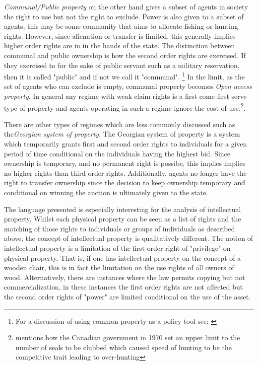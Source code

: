 \documentclass[12pt]{article}
\numberwithin{equation}{section}
\begin{document}
\textit{Communal/Public property} on the other hand gives a subset of agents in society the right to use but not the right to exclude. Power is also given to a subset of agents, this may be some community that aims to allocate fishing or hunting rights. 
However, since alienation or transfer is limited, this generally implies higher order rights are in in the hands of the state. The distinction between communal and public ownership is how the second order rights are exercised. If they exercised to for the sake of public servant such as a military reservation, then it is called "public" and if not we call it "communal". \footnote{For a discussion of using common property as a policy tool see: \cite{ciriacy1975common}} In the limit, as the set of agents who can exclude is empty, communal property becomes \textit{Open access property}. In general any regime with weak claim rights is a first come first serve type of property and agents operating in such a regime ignore the cost of use.\footnote{\cite{Alchian1973} mentions how the Canadian government in 1970 set an upper limit to the number of seals to be clubbed which caused speed of hunting to be the competitive trait leading to over-hunting}. 

There are other types of regimes which are less commonly discussed such as the\textit{Georgian system of property}. The Georgian system of property is a system which temporarily grants first and second order rights to individuals for a given period of time conditional on the individuals having the highest bid. Since ownership is temporary, and no permanent right is possibe, this implies implies no higher rights than third order rights. Additionally, agents no longer have the right to transfer ownership since the decision to keep ownership temporary and conditional on winning the auction is ultimately given to the state. 

The language presented is especially interesting for the analysis of intellectual property. Whilst each physical property can be seen as a list of rights and the matching of those rights to individuals or groups of individuals as described above, the concept of intellectual property is qualitatively different. The notion of intellectual property is a limitation of the first order right of "privilege" on physical property. That is, if one has intellectual property on the concept of a wooden chair, this is in fact the limitation on the use rights of all owners of wood. Alternatively, there are instances where the law permits copying but not commercialization, in these instances the first order rights are not affected but the second order rights of "power" are limited conditional on the use of the asset. 
\end{document}
